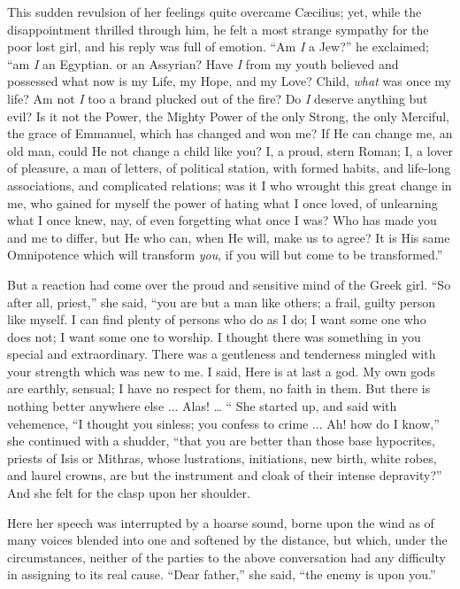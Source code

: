 This sudden revulsion of her feelings quite overcame Cæcilius;
yet, while the disappointment thrilled through him, he felt a most
strange sympathy for the poor lost girl, and his reply was full of
emotion. ``Am \emph{I} a Jew?'' he exclaimed; ``am \emph{I}
an Egyptian. or an Assyrian? Have \emph{I} from my youth believed and
possessed what now is my Life, my Hope, and my Love? Child, \emph{what}
was once my life? Am not \emph{I} too a brand plucked out of the fire?
Do \emph{I} deserve anything but evil? Is it not the Power, the Mighty
Power of the only Strong, the only Merciful, the grace of Emmanuel,
which has changed and won me? If He can change me, an old man, could
He not change a child like you? I, a proud, stern Roman; I, a lover of
pleasure, a man of letters, of political station, with formed habits,
and life-long associations, and complicated relations; was it I who
wrought this great change in me, who gained for myself the power
of hating what I once loved, of unlearning what I once knew, nay, of
even forgetting what once I was? Who has made you and me to differ,
but He who can, when He will, make us to agree? It is His same
Omnipotence which will transform \emph{you}, if you will but come to
be transformed.''

But a reaction had come over the proud and sensitive mind of the
Greek girl. ``So after all, priest,'' she said, ``you are
but a man like others; a frail, guilty person like myself. I can find
plenty of persons who do as I do; I want some one who does not; I want
some one to worship. I thought there was something in you special and
extraordinary. There was a gentleness and tenderness mingled with your
strength which was new to me. I said, Here is at last a god. My own
gods are earthly, sensual; I have no respect for them, no faith in
them. But there is nothing better anywhere else ... Alas! … ``
She started up, and said with vehemence, ``I thought you sinless;
you confess to crime ... Ah! how do I know,'' she continued with a
shudder, ``that you are better than those base hypocrites, priests
of Isis or Mithras, whose lustrations, initiations, new birth, white
robes, and laurel crowns, are but the instrument and cloak of their
intense depravity?'' And she felt for the clasp upon her shoulder.

Here her speech was interrupted by a hoarse sound, borne upon the
wind as of many voices blended into one and softened by the
distance, but which, under the circumstances, neither of the parties
to the above conversation had any difficulty in assigning to its real
cause. ``Dear father,'' she said, ``the enemy is upon
you.''

